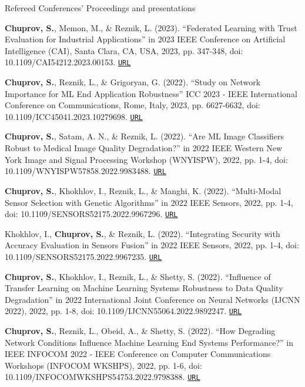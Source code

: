 \begin{rSection}{Refereed Conferences' Proceedings and presentations}
\begin{enumerate}[label=[C{{\arabic*}]}]
\item \textbf{Chuprov, S.}, Memon, M., \& Reznik, L. (2023). ``Federated Learning with Trust Evaluation for Industrial Applications'' in 2023 IEEE Conference on Artificial Intelligence (CAI), Santa Clara, CA, USA, 2023, pp. 347-348, doi: 10.1109/CAI54212.2023.00153.
\href{https://ieeexplore.ieee.org/document/10195142}{\nolinkurl{URL}}

\item \textbf{Chuprov, S.}, Reznik, L., \& Grigoryan, G. (2022). ``Study on Network Importance for ML End Application Robustness'' ICC 2023 - IEEE International Conference on Communications, Rome, Italy, 2023, pp. 6627-6632, doi: 10.1109/ICC45041.2023.10279698.
\href{https://ieeexplore.ieee.org/document/10279698}{\nolinkurl{URL}}


\item \textbf{Chuprov, S.}, Satam, A. N., \& Reznik, L. (2022). ``Are ML Image Classifiers Robust to Medical Image Quality Degradation?'' in 2022 IEEE Western New York Image and Signal Processing Workshop (WNYISPW), 2022, pp. 1-4, doi: 10.1109/WNYISPW57858.2022.9983488.
\href{https://ieeexplore.ieee.org/document/9983488}{\nolinkurl{URL}}

\item \textbf{Chuprov, S.}, Khokhlov, I., Reznik, L., \& Manghi, K. (2022). ``Multi-Modal Sensor Selection with Genetic Algorithms'' in 2022 IEEE Sensors, 2022, pp. 1-4, doi: 10.1109/SENSORS52175.2022.9967296.
\href{https://ieeexplore.ieee.org/document/9967296}{\nolinkurl{URL}}

\item Khokhlov, I., \textbf{Chuprov, S.}, \& Reznik, L. (2022). ``Integrating Security with Accuracy Evaluation in Sensors Fusion'' in 2022 IEEE Sensors, 2022, pp. 1-4, doi: 10.1109/SENSORS52175.2022.9967235.
\href{https://ieeexplore.ieee.org/document/9967235}{\nolinkurl{URL}}

\item \textbf{Chuprov, S.}, Khokhlov, I., Reznik, L., \& Shetty, S. (2022). ``Influence of Transfer Learning on Machine Learning Systems Robustness to Data Quality Degradation'' in 2022 International Joint Conference on Neural Networks (IJCNN 2022), 2022, pp. 1-8, doi: 10.1109/IJCNN55064.2022.9892247. \href{https://ieeexplore.ieee.org/abstract/document/9892247}{\nolinkurl{URL}}

\item \textbf{Chuprov, S.}, Reznik, L., Obeid, A., \& Shetty, S. (2022). ``How Degrading Network Conditions Influence Machine Learning End Systems Performance?'' in IEEE INFOCOM 2022 - IEEE Conference on Computer Communications Workshops (INFOCOM WKSHPS), 2022, pp. 1-6, doi: 10.1109/INFOCOMWKSHPS54753.2022.9798388. \href{https://ieeexplore.ieee.org/abstract/document/9798388?casa_token=F_FXxDTupigAAAAA:OyMilDynWbzOuAZ4SjcNAbJR9_2PQubP-8I1GWdwoHncOIxMz7boIrtaOs2ik7b6BY_C72m2DQ}{\nolinkurl{URL}}


\end{enumerate}
\end{rSection}
